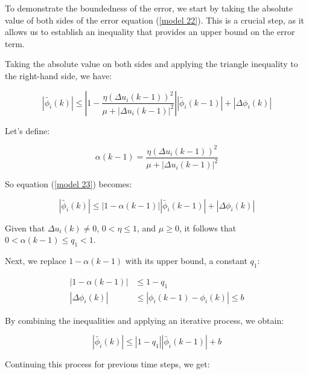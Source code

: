 \documentclass[journal,onecolumn]{IEEEtran}
\begin{document}

To demonstrate the boundedness of the error, we start by taking the absolute value of both sides of the error equation (\ref{model 22}). This is a crucial step, as it allows us to establish an inequality that provides an upper bound on the error term.

Taking the absolute value on both sides and applying the triangle inequality to the right-hand side, we have:

\begin{equation}
\label{model 23}
|\tilde{\phi_i}(k)| \leq \left| 1 - \frac{\eta (\Delta u_i(k-1))^2}{\mu + |\Delta u_i(k-1)|^2} \right| |\tilde{\phi_i}(k-1)| + |\Delta \phi_i(k)|
\end{equation}

Let’s define:

\begin{equation}
\label{model 24}
\alpha(k-1) = \frac{\eta (\Delta u_i(k-1))^2}{\mu + |\Delta u_i(k-1)|^2}
\end{equation}

So equation (\ref{model 23}) becomes:

\begin{equation}
\label{model 25}
|\tilde{\phi_i}(k)| \leq |1 - \alpha(k-1)| |\tilde{\phi_i}(k-1)| + |\Delta \phi_i(k)|
\end{equation}

Given that \(\Delta u_i(k) \neq 0\), \(0 < \eta \leq 1\), and \(\mu \geq 0\), it follows that \(0 < \alpha(k-1) \leq q_1 < 1\).

Next, we replace \(1 - \alpha(k-1)\) with its upper bound, a constant \(q_1\):

\begin{align}
\label{model 26}
|1 - \alpha(k-1)| &\leq 1 - q_1 \\
|\Delta \phi_i(k)| &\leq |\phi_i(k-1) - \phi_i(k)| \leq b
\end{align}

By combining the inequalities and applying an iterative process, we obtain:

\begin{equation}
\label{model 27}
|\tilde{\phi_i}(k)| \leq |1 - q_1| |\tilde{\phi_i}(k-1)| + b
\end{equation}

Continuing this process for previous time steps, we get:
\end{document}
